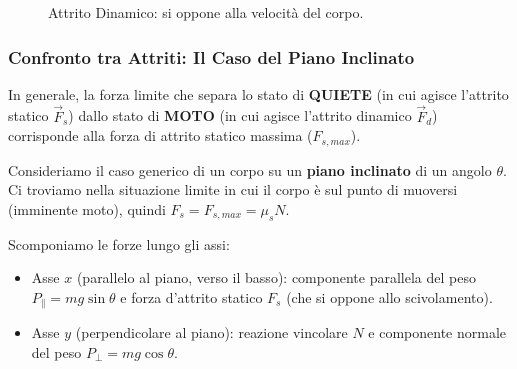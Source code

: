 \begin{figure}[h!]
    \centering
    \caption{Attrito Dinamico: si oppone alla velocità del corpo.}
    \label{fig:attrito_dinamico}
\end{figure}

\subsubsection{Confronto tra Attriti: Il Caso del Piano Inclinato}
In generale, la forza limite che separa lo stato di \textbf{QUIETE} (in cui agisce l'attrito statico $\vec{F}_s$) dallo stato di \textbf{MOTO} (in cui agisce l'attrito dinamico $\vec{F}_d$) corrisponde alla forza di attrito statico massima ($F_{s,max}$).

Consideriamo il caso generico di un corpo su un \textbf{piano inclinato} di un angolo $\theta$. Ci troviamo nella situazione limite in cui il corpo è sul punto di muoversi (imminente moto), quindi $F_s = F_{s,max} = \mu_s N$.

Scomponiamo le forze lungo gli assi:
\begin{itemize}
    \item Asse $x$ (parallelo al piano, verso il basso): componente parallela del peso $P_{\parallel} = mg \sin\theta$ e forza d'attrito statico $F_s$ (che si oppone allo scivolamento).
    \item Asse $y$ (perpendicolare al piano): reazione vincolare $N$ e componente normale del peso $P_{\perp} = mg \cos\theta$.
\end{itemize}

